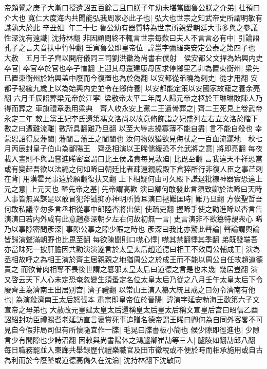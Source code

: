 帝頗覺之庚子大漸口授遺詔五百餘言且曰朕子年幼未堪當國魯公朕之介弟|{
	杜預曰介大也}
寛仁大度海内共聞能弘我周家必此子也|{
	弘大也世宗之知武帝史所謂明敏有識孰大於此}
辛丑殂|{
	年二十七}
魯公幼有器質特為世宗所親愛朝廷大事多與之參議性深沈有遠識|{
	沈持林翻}
非因顧問終不輒言世宗每歎曰夫人不言言必有中|{
	引論語孔子之言夫音扶中竹仲翻}
壬寅魯公即皇帝位|{
	諱邕字彌羅突安定公泰之第四子也}
大赦　五月壬子齊以開府儀同三司劉洪徽為尚書右僕射　侯安都父文捍為始興内史卒官|{
	卒官卒於官也卒子恤翻}
上迎其母還建康母固求停鄉里乙卯為置東衡州|{
	梁先已置東衡州於始興盖中廢而今復置也為於偽翻}
以安都從弟曉為刺史|{
	從才用翻}
安都子袐纔九歲上以為始興内史並令在鄉侍養|{
	以安都能定策以安國家故寵之養余亮翻}
六月壬辰詔葬梁元帝於江寜|{
	梁敬帝太平二年周人歸元帝之柩於王琳琳敗陳人乃得而葬之}
車旗禮章悉用梁典　齊人收永安上黨二王遺骨葬之|{
	齊二王死見上卷武帝永定二年}
敕上黨王妃李氏還第馮文洛尚以故意脩飾詣之妃盛列左右立文洛於階下數之曰遭難流離|{
	數所具翻難乃旦翻}
以至大辱志操寡薄不能自盡|{
	言不能自殺也}
幸蒙恩詔得反藩闈|{
	藩闈言藩王之閨闈也}
汝何物奴猶欲見侮杖之一百血流灑地　秋七月丙辰封皇子伯山為鄱陽王　齊丞相演以王晞儒緩恐不允武將之意|{
	將即亮翻}
每夜載入晝則不與語嘗進晞密室謂曰比王侯諸貴每見敦廹|{
	比毘至翻}
言我違天不祥恐當或有變起吾欲以法繩之何如晞曰朝廷比者疎遠親戚殿下倉猝所行非復人臣之事芒刺在背|{
	用漢霍光事遠於願翻復扶又翻}
上下相疑何由可久殿下謙退粃糠神器實恐違上元之意|{
	上元天也}
墜先帝之基|{
	先帝謂高歡}
演曰卿何敢發此言須致卿於法晞曰天時人事皆無異謀是以敢冒犯斧钺抑亦神明所贊耳演曰拯難匡時|{
	難乃旦翻}
方俟聖哲吾何敢私議幸勿多言丞相從事中郎陸杳將出使|{
	使疏吏翻}
握晞手使之勸進晞以杳言告演演曰若内外咸有此意趙彥深朝夕左右何故初無一言|{
	史言演非不欲簒特覘衆心}
晞乃以事隙密問彥深|{
	事隙公事之隙少暇之時也}
彥深曰我比亦驚此聲論|{
	聲論謂輿論皆歸演聲滿朝野也比毘至翻}
每欲陳聞則口噤心悸|{
	噤其禁翻悸其季翻}
弟既發端吾亦當昧死一披肝膽因共勸演演遂言於太皇太后趙道德曰相王不效周公輔成王|{
	演為丞相故呼之為相王演於齊主居親親之地猶周公之於成王而不能以周公自任故趙道德責之}
而欲骨肉相奪不畏後世謂之簒邪太皇太后曰道德之言是也未幾|{
	幾居豈翻}
演又啓云天下人心未定恐奄忽變生須蚤定名位太皇太后乃從之八月壬午太皇太后下令廢齊主為濟南王出居别宫|{
	濟子禮翻}
以常山王演入纂大統且戒之曰勿令濟南有他也|{
	為演殺濟南王太后怒張本}
肅宗即皇帝位於晉陽|{
	諱演字延安勃海王歡第六子文宣帝之母弟也}
大赦改元皇建太皇太后還稱皇太后皇太后稱文宣皇后宫曰昭信乙酉詔紹封功臣禮賜耆老延訪直言褒賞死事追贈名德帝謂王晞曰卿何為自同外客畧不可見自今假非局司但有所懷隨宜作一牒|{
	毛晃曰牒書板小簡也}
候少隙即徑進也|{
	少隙言少有間隙也少詩沼翻}
因敕與尚書陽休之鴻臚卿崔劼等三人|{
	臚陵如翻劼邱八翻}
每日職務罷並入東廊共舉録歷代禮樂職官及田市徵稅或不便於時而相承施用或自古為利而於今廢墜或道德高儁久在沈淪|{
	沈持林翻下沈敏同}
